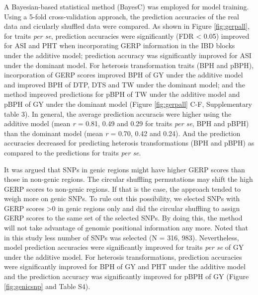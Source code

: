 \documentclass[9pt,twocolumn,twoside]{gsajnl}
\begin{document}
A Bayesian-based statistical method (BayesC) \citep{habier2011extension} was employed for model training. Using a 5-fold cross-validation approach, the prediction accuracies of the real data and cicularly shuffled data were compared. As shown in Figure \ref{fig:gerpall}, for traits \emph{per se}, prediction accuracies were significantly (FDR < 0.05) improved for ASI and PHT when incorporating GERP information in the IBD blocks under the additive model; prediction accuracy was significantly improved for ASI under the dominant model. For heterosis transformation traits (BPH and pBPH), incorporation of GERP scores improved BPH of GY under the additive model and improved BPH of DTP, DTS and TW under the dominant model; and the method improved predictions for pBPH of TW under the additive model and pBPH of GY under the dominant model (Figure \ref{fig:gerpall} C-F, Supplementary table 3). In general, the average prediction accuracis were higher using the additive model (mean \emph{r} = 0.81, 0.49 and 0.29 for traits \emph{per se}, BPH and pBPH) than the dominant model (mean \emph{r} = 0.70, 0.42 and 0.24). And the prediction accuracies decreased for predicting heterosis transformations (BPH and pBPH) as compared to the predictions for traits \emph{per se}.

It was argued that SNPs in genic regions might have higher GERP scores than those in non-genic regions. The circular shuffling permutations may shift the high GERP scores to non-genic regions. If that is the case, the approach tended to weigh more on genic SNPs.  To rule out this possibility, we elected SNPs with GERP scores >0 in genic regions only and did the circular shuffling to assign GERP scores to the same set of the selected SNPs. By doing this, the method will not take advantage of genomic positional information any more. Noted that in this study less number of SNPs was selected (N = 316, 983). Nevertheless, model prediction accuracies were significantly improved for traits \emph{per se} of GY under the additive model. For heterosis transformations, prediction accuracies were significantly improved for BPH of GY and PHT under the additive model and the prediction accuracy was significantly improved for pBPH of GY (Figure \ref{fig:genicsnp} and Table S4).   
\end{document}
